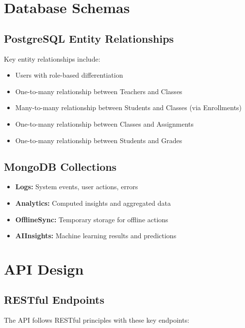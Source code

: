 \documentclass[11pt]{report}
\begin{document}
\section{Database Schemas}

\subsection{PostgreSQL Entity Relationships}
Key entity relationships include:
\begin{itemize}
    \item Users with role-based differentiation
    \item One-to-many relationship between Teachers and Classes
    \item Many-to-many relationship between Students and Classes (via Enrollments)
    \item One-to-many relationship between Classes and Assignments
    \item One-to-many relationship between Students and Grades
\end{itemize}

\subsection{MongoDB Collections}
\begin{itemize}
    \item \textbf{Logs:} System events, user actions, errors
    \item \textbf{Analytics:} Computed insights and aggregated data
    \item \textbf{OfflineSync:} Temporary storage for offline actions
    \item \textbf{AIInsights:} Machine learning results and predictions
\end{itemize}

\section{API Design}

\subsection{RESTful Endpoints}
The API follows RESTful principles with these key endpoints:
\end{document}
